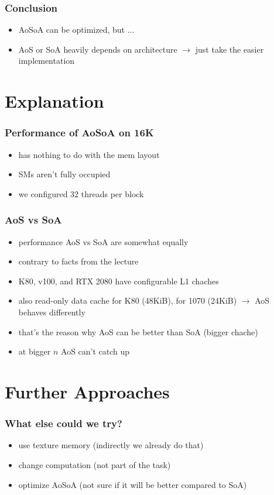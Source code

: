 \documentclass[aspectratio=169]{beamer}
\begin{document}
\begin{frame}
\end{frame}

\begin{frame}
	\frametitle{Conclusion}
	\begin{itemize}
		\item AoSoA can be optimized, but ...
		\item AoS or SoA heavily depends on architecture \(\rightarrow\) just take the easier implementation
	\end{itemize}
\end{frame}


\section{Explanation}
\begin{frame}
	\frametitle{Performance of AoSoA on 16K}
	\begin{itemize}
		\item has nothing to do with the mem layout
		\item SMs aren't fully occupied
		\item we configured 32 threads per block
	\end{itemize}
\end{frame}

\begin{frame}
	\frametitle{AoS vs SoA}
	\begin{itemize}
		\item performance AoS vs SoA are somewhat equally
		\item contrary to facts from the lecture
		\item K80, v100, and RTX 2080 have configurable L1 chaches
		\item also read-only data cache for K80 (48KiB), for 1070 (24KiB) \(\rightarrow\) AoS behaves differently
		\item that's the reason why AoS can be better than SoA (bigger chache)
		\item at bigger  \(n\) AoS can't catch up
	\end{itemize}
\end{frame}




\section{Further Approaches}
\begin{frame}
	\frametitle{What else could we try?}
	\begin{itemize}
		\item use texture memory (indirectly we already do that)
		\item change computation (not part of the task)
		\item optimize AoSoA (not sure if it will be better compared to SoA)
	\end{itemize}
\end{frame}
\end{document}
